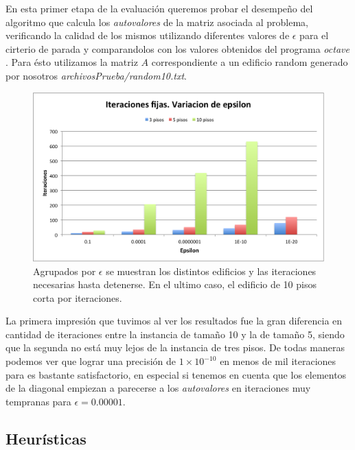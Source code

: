 \documentclass[a4paper]{article}
\begin{document}
En esta primer etapa de la evaluación queremos probar el desempeño del algoritmo que calcula los \textit{autovalores} de la matriz asociada al problema, verificando la calidad de los mismos utilizando diferentes valores de $\epsilon$ para el cirterio de parada y comparandolos con los valores obtenidos del programa \textit{octave} . Para ésto utilizamos la matriz $A$ correspondiente a un edificio random generado por nosotros \textit{archivosPrueba/random10.txt}. 





\begin{figure}[H]
  \centering
  \includegraphics[scale=0.75]{graficos/1-Cantidad_iteraciones_por_piso.png}
  \caption{Agrupados por $\epsilon$ se muestran los distintos edificios y las iteraciones necesarias hasta detenerse. En el ultimo caso, el edificio de 10 pisos corta por iteraciones.}
\end{figure}

La primera impresión que tuvimos al ver los resultados fue la gran diferencia en cantidad de iteraciones entre la instancia de tamaño 10 y la de tamaño 5, siendo que la segunda no está muy lejos de la instancia de tres pisos. De todas maneras podemos ver que lograr una precisión de $1\times 10^{-10}$ en menos de mil iteraciones para es bastante satisfactorio, en especial si tenemos en cuenta que los elementos de la diagonal empiezan a parecerse a los \textit{autovalores} en iteraciones muy tempranas para $\epsilon = 0.00001$.

\subsection{Heurísticas}
\end{document}
